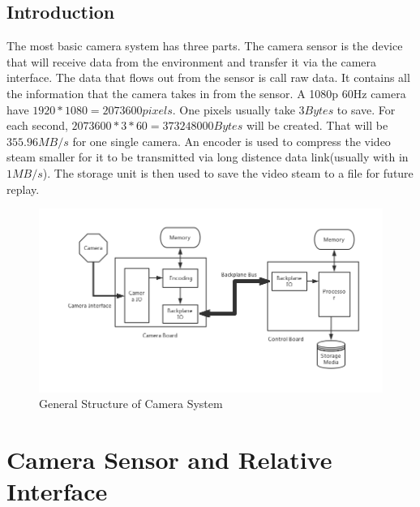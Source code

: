 \documentclass[12pt,article]{memoir}
\begin{document}
\section{Introduction}
The most basic camera system has three parts. The camera sensor is the device that will receive data from the environment and transfer it via the camera interface. The data that flows out from the sensor is call raw data. It contains all the information that the camera takes in from the sensor. A 1080p 60Hz camera have $1920*1080=2073600 pixels$. One pixels usually take $3 Bytes$ to save. For each second, $2073600*3*60=373248000Bytes$ will be created. That will be $355.96MB/s$ for one single camera. An encoder is used to compress the video steam smaller for it to be transmitted via long distence data link(usually with in $1MB/s$). The storage unit is then used to save the video steam to a file for future replay.
\begin{figure}[htp]
\includegraphics[width=\textwidth]{img/DR00002_GenDia.png}
 \caption{General Structure of Camera System}	
\end{figure}
\newpage
%
\chapter{Camera Sensor and Relative Interface}
\end{document}
